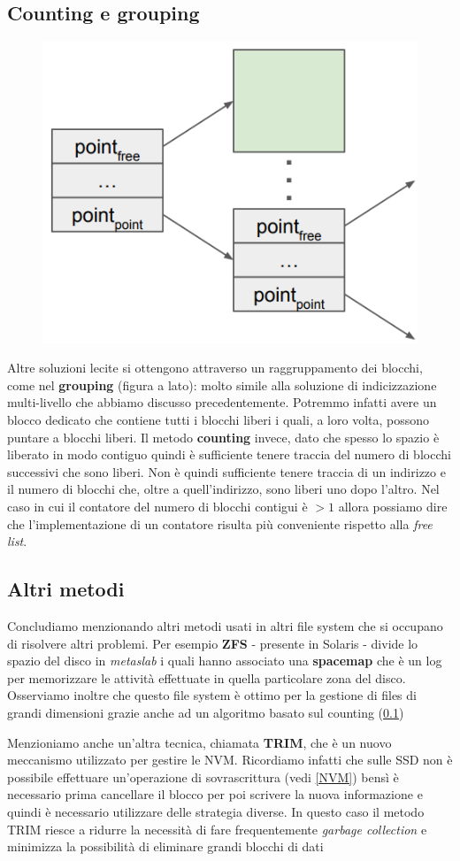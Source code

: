 \subsection{Counting e grouping}\label{Counting}
\begin{figure}
    \centering
    \includegraphics[width = .3\textwidth]{../res/imgs/file system implementation/grouping.png}
\end{figure}
Altre soluzioni lecite si ottengono attraverso un raggruppamento dei blocchi, come nel \textbf{grouping} (figura a lato): molto simile alla soluzione di indicizzazione multi-livello che abbiamo discusso precedentemente. Potremmo infatti avere un blocco dedicato che contiene tutti i blocchi liberi i quali, a loro volta, possono puntare a blocchi liberi. Il metodo \textbf{counting} invece, dato che spesso lo spazio è liberato in modo contiguo quindi è sufficiente tenere traccia del numero di blocchi successivi che sono liberi. Non è quindi sufficiente tenere traccia di un indirizzo e il numero di blocchi che, oltre a quell'indirizzo, sono liberi uno dopo l'altro. Nel caso in cui il contatore del numero di blocchi contigui è $> 1$ allora possiamo dire che l'implementazione di un contatore risulta più conveniente rispetto alla \textit{free list}.

% 
\subsection{Altri metodi}
Concludiamo menzionando altri metodi usati in altri file system che si occupano di risolvere altri problemi. Per esempio \textbf{ZFS} - presente in Solaris - divide lo spazio del disco in \textit{metaslab} i quali hanno associato una \textbf{spacemap} che è un log per memorizzare le attività effettuate in quella particolare zona del disco. Osserviamo inoltre che questo file system è ottimo per la gestione di files di grandi dimensioni grazie anche ad un algoritmo basato sul counting (\ref{Counting})

Menzioniamo anche un'altra tecnica, chiamata \textbf{TRIM}, che è un nuovo meccanismo utilizzato per gestire le NVM. Ricordiamo infatti che sulle SSD non è possibile effettuare un'operazione di sovrascrittura (vedi \ref{NVM}) bensì è necessario prima cancellare il blocco per poi scrivere la nuova informazione e quindi è necessario utilizzare delle strategia diverse. In questo caso il metodo TRIM riesce a ridurre la necessità di fare frequentemente \textit{garbage collection} e minimizza la possibilità di eliminare grandi blocchi di dati
